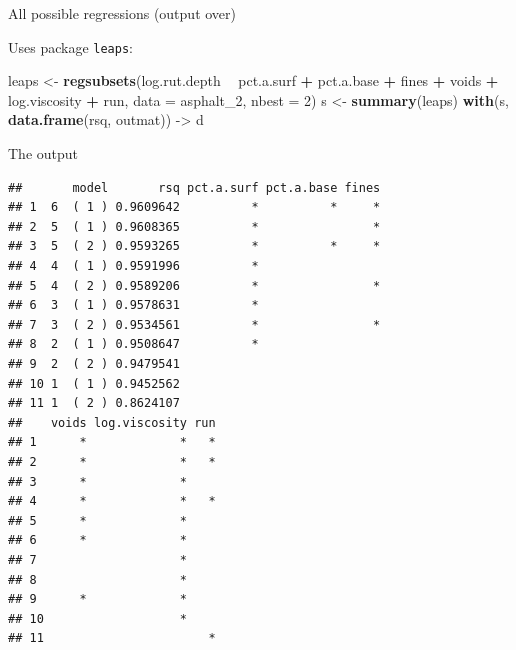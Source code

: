 \documentclass[ignorenonframetext,]{beamer}
\newenvironment{Shaded}{\begin{snugshade}}{\end{snugshade}}
\newcommand{\DataTypeTok}[1]{\textcolor[rgb]{0.13,0.29,0.53}{#1}}
\newcommand{\DecValTok}[1]{\textcolor[rgb]{0.00,0.00,0.81}{#1}}
\newcommand{\KeywordTok}[1]{\textcolor[rgb]{0.13,0.29,0.53}{\textbf{#1}}}
\newcommand{\NormalTok}[1]{#1}
\newcommand{\OperatorTok}[1]{\textcolor[rgb]{0.81,0.36,0.00}{\textbf{#1}}}
\newcommand{\StringTok}[1]{\textcolor[rgb]{0.31,0.60,0.02}{#1}}
\begin{document}
\begin{frame}[fragile]{All possible regressions (output over)}
\protect\hypertarget{all-possible-regressions-output-over}{}

Uses package \texttt{leaps}:

\begin{Shaded}
\begin{Highlighting}[]
\NormalTok{leaps <-}\StringTok{ }\KeywordTok{regsubsets}\NormalTok{(log.rut.depth }\OperatorTok{~}\StringTok{ }\NormalTok{pct.a.surf }\OperatorTok{+}\StringTok{ }\NormalTok{pct.a.base }\OperatorTok{+}\StringTok{ }\NormalTok{fines }\OperatorTok{+}\StringTok{ }\NormalTok{voids }\OperatorTok{+}
\StringTok{  }\NormalTok{log.viscosity }\OperatorTok{+}\StringTok{ }\NormalTok{run, }\DataTypeTok{data =}\NormalTok{ asphalt_}\DecValTok{2}\NormalTok{, }\DataTypeTok{nbest =} \DecValTok{2}\NormalTok{)}
\NormalTok{s <-}\StringTok{ }\KeywordTok{summary}\NormalTok{(leaps)}
\KeywordTok{with}\NormalTok{(s, }\KeywordTok{data.frame}\NormalTok{(rsq, outmat)) ->}\StringTok{ }\NormalTok{d}
\end{Highlighting}
\end{Shaded}

\end{frame}

\begin{frame}[fragile]{The output}
\protect\hypertarget{the-output}{}

\begin{Shaded}
\end{Shaded}

\begin{verbatim}
##       model       rsq pct.a.surf pct.a.base fines
## 1  6  ( 1 ) 0.9609642          *          *     *
## 2  5  ( 1 ) 0.9608365          *                *
## 3  5  ( 2 ) 0.9593265          *          *     *
## 4  4  ( 1 ) 0.9591996          *                 
## 5  4  ( 2 ) 0.9589206          *                *
## 6  3  ( 1 ) 0.9578631          *                 
## 7  3  ( 2 ) 0.9534561          *                *
## 8  2  ( 1 ) 0.9508647          *                 
## 9  2  ( 2 ) 0.9479541                            
## 10 1  ( 1 ) 0.9452562                            
## 11 1  ( 2 ) 0.8624107                            
##    voids log.viscosity run
## 1      *             *   *
## 2      *             *   *
## 3      *             *    
## 4      *             *   *
## 5      *             *    
## 6      *             *    
## 7                    *    
## 8                    *    
## 9      *             *    
## 10                   *    
## 11                       *
\end{verbatim}

\end{frame}
\end{document}

